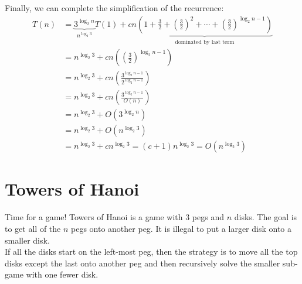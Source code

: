\documentclass[14pt]{extarticle}
\begin{document}
    Finally, we can complete the simplification of the recurrence:
    \begin{align*}
        T(n) &= \underbrace{3^{\log_2 n}}_{n^{\log_2 3}}T(1) +  
            cn\underbrace{\left(1 + \frac{3}{2} 
            + \left(\frac{3}{2}\right)^2 
            + \cdots
            + \left(\frac{3}{2}\right)^{\log_2 n - 1}
        \right)}_{\text{dominated by last term}}                \\
             &= n^{\log_2 3} + cn\left(
                 \left(\frac{3}{2}\right)^{\log_2 n - 1}
             \right)                                            \\
             &= n^{\log_2 3} + cn\left(
                 \frac{3^{\log_2 n - 1}}{2^{\log_2 n - 1}}
             \right)                                            \\
             &= n^{\log_2 3} + cn\left(
                 \frac{3^{\log_2 n - 1}}{O(n)}
             \right)                                            \\
             &= n^{\log_2 3} + O(3^{\log_2 n})                  \\
             &= n^{\log_2 3} + O(n^{\log_2 3})                  \\
             &= n^{\log_2 3} + cn^{\log_2 3}                
              = (c+1)n^{\log_2 3}                               
              = \boxed{O(n^{\log_2 3})}
    \end{align*}

    \section{Towers of Hanoi}
    Time for a game! Towers of Hanoi is a game with 3 pegs and $n$
    disks. The goal is to get all of the $n$ pegs onto another peg.
    It is illegal to put a larger disk onto a smaller disk.\\

    If all the disks start on the left-most peg, then the strategy is
    to move all the top disks except the last onto another peg and then
    recursively solve the smaller sub-game with one fewer disk.\\
\end{document}
